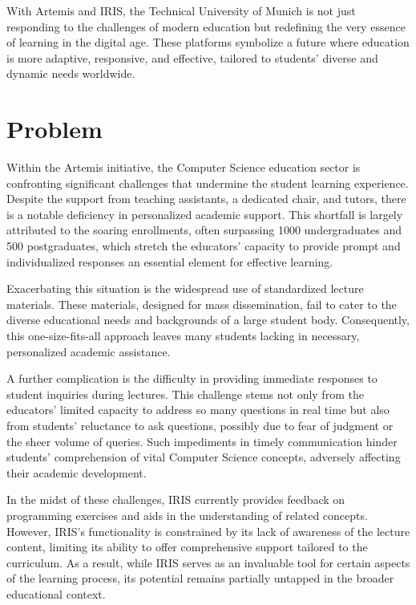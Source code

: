\documentclass[a4paper,12pt,twoside]{article}
\begin{document}
            With Artemis and IRIS, the Technical University of Munich is not just responding to the challenges of modern education but redefining the very essence of learning in the digital age. These platforms symbolize a future where education is more adaptive, responsive, and effective, tailored to students' diverse and dynamic needs worldwide. 
     
    
                
\section{Problem}

Within the Artemis initiative, the Computer Science education sector is confronting significant challenges that undermine the student learning experience. Despite the support from teaching assistants, a dedicated chair, and tutors, there is a notable deficiency in personalized academic support. This shortfall is largely attributed to the soaring enrollments, often surpassing 1000 undergraduates and 500 postgraduates, which stretch the educators' capacity to provide prompt and individualized responses an essential element for effective learning.\cite{1}

Exacerbating this situation is the widespread use of standardized lecture materials. These materials, designed for mass dissemination, fail to cater to the diverse educational needs and backgrounds of a large student body. Consequently, this one-size-fits-all approach leaves many students lacking in necessary, personalized academic assistance.

A further complication is the difficulty in providing immediate responses to student inquiries during lectures. This challenge stems not only from the educators' limited capacity to address so many questions in real time but also from students' reluctance to ask questions, possibly due to fear of judgment or the sheer volume of queries. Such impediments in timely communication hinder students' comprehension of vital Computer Science concepts, adversely affecting their academic development.

In the midst of these challenges, IRIS currently provides feedback on programming exercises and aids in the understanding of related concepts. However, IRIS's functionality is constrained by its lack of awareness of the lecture content, limiting its ability to offer comprehensive support tailored to the curriculum. As a result, while IRIS serves as an invaluable tool for certain aspects of the learning process, its potential remains partially untapped in the broader educational context.
\end{document}
